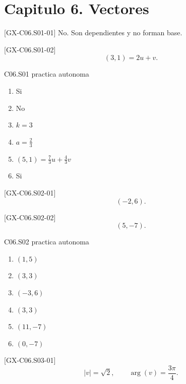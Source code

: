 \section*{Capitulo 6. Vectores}

\begin{shortanswer}{[GX-C06.S01-01]}
No. Son dependientes y no forman base.
\end{shortanswer}

\begin{shortanswer}{[GX-C06.S01-02]}
\[
(3,1)=2u+v.
\]
\end{shortanswer}

\begin{shortanswer}{C06.S01 practica autonoma}
\begin{enumerate}[label=\textbf{PX-C06.S01-\arabic*:}, leftmargin=*]
  \item Si
  \item No
  \item \(k=3\)
  \item \(a=\frac{2}{3}\)
  \item \((5,1)=\frac{7}{3}u+\frac{4}{3}v\)
  \item Si
\end{enumerate}
\end{shortanswer}

\begin{shortanswer}{[GX-C06.S02-01]}
\[
(-2,6).
\]
\end{shortanswer}

\begin{shortanswer}{[GX-C06.S02-02]}
\[
(5,-7).
\]
\end{shortanswer}

\begin{shortanswer}{C06.S02 practica autonoma}
\begin{enumerate}[label=\textbf{PX-C06.S02-\arabic*:}, leftmargin=*]
  \item \((1,5)\)
  \item \((3,3)\)
  \item \((-3,6)\)
  \item \((3,3)\)
  \item \((11,-7)\)
  \item \((0,-7)\)
\end{enumerate}
\end{shortanswer}

\begin{shortanswer}{[GX-C06.S03-01]}
\[
|v|=\sqrt{2},
\qquad
\arg(v)=\frac{3\pi}{4}.
\]
\end{shortanswer}

